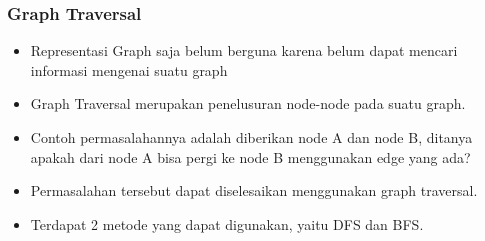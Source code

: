 \begin{frame}
\frametitle{Graph Traversal}

\begin{itemize}
  \item Representasi Graph saja belum berguna karena belum dapat mencari informasi mengenai suatu graph
  \item \alert{Graph Traversal} merupakan penelusuran node-node pada suatu graph.
  \item Contoh permasalahannya adalah diberikan node A dan node B, ditanya apakah dari node A bisa pergi ke node B menggunakan edge yang ada?
  \item Permasalahan tersebut dapat diselesaikan menggunakan graph traversal.
  \item Terdapat 2 metode yang dapat digunakan, yaitu DFS dan BFS.
\end{itemize}
\end{frame}

